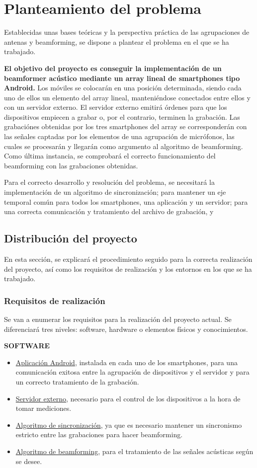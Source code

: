 \documentclass[a4paper,11pt]{book}
\begin{document}
\chapter{Planteamiento del problema}

Establecidas unas bases teóricas y la perspectiva práctica de las agrupaciones de antenas y beamforming, se dispone a plantear el problema en el que se ha trabajado.

\textbf{El objetivo del proyecto es conseguir la implementación de un beamformer acústico mediante un array lineal de smartphones tipo Android.} Los móviles se colocarán en una posición determinada, siendo cada uno de ellos un elemento del array lineal, manteniéndose conectados entre ellos y con un servidor externo. El servidor externo emitirá órdenes para que los dispositivos empiecen a grabar o, por el contrario, terminen la grabación. Las grabaciónes obtenidas por los tres smartphones del array se corresponderán con las señales captadas por los elementos de una agrupación de micrófonos, las cuales se procesarán y llegarán como argumento al algoritmo de beamforming. Como última instancia, se comprobará el correcto funcionamiento del beamforming con las grabaciones obtenidas.


 Para el correcto desarrollo y resolución del problema, se necesitará la implementación de un algoritmo de sincronización; para mantener un eje temporal común para todos los smartphones, una aplicación y un servidor; para una correcta comunicación y tratamiento del archivo de grabación, y 
	\section{Distribución del proyecto}
	En esta sección, se explicará el procedimiento seguido para la correcta realización del proyecto, así como los requisitos de realización y los entornos en los que se ha trabajado.
		\subsection{Requisitos de realización}
		Se van a enumerar los requisitos para la realización del proyecto actual. Se diferenciará tres niveles: software, hardware o elementos físicos y conocimientos.
\vspace{0.5cm}	
			
\textbf{SOFTWARE	}
\begin{itemize}
	\item \underline{Aplicación Android}, instalada en cada uno de los smartphones, para una comunicación exitosa entre la agrupación de dispositivos y el servidor y para un correcto tratamiento de la grabación.
	\item \underline{Servidor externo}, necesario para el control de los dispositivos a la hora de tomar mediciones.
	\item \underline{Algoritmo de sincronización}, ya que es necesario mantener un sincronismo estricto entre las grabaciones para hacer beamforming.
	\item \underline{Algoritmo de beamforming}, para el tratamiento de las señales acústicas según se desee.
	\end{itemize}
\vspace{0.5cm}
		
\end{document}
